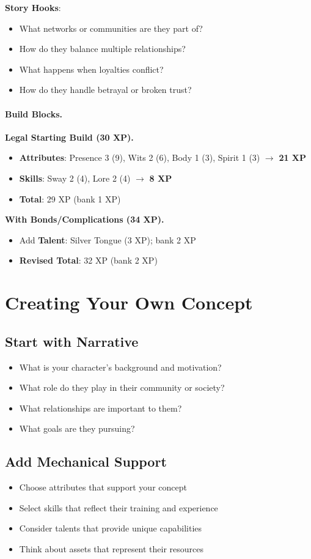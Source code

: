 \begin{multicols}{2}
\textbf{Story Hooks}:
\begin{itemize}
\item What networks or communities are they part of?
\item How do they balance multiple relationships?
\item What happens when loyalties conflict?
\item How do they handle betrayal or broken trust?
\end{itemize}

\paragraph{Build Blocks.}
\textbf{Legal Starting Build (30 XP).}
\begin{itemize}
\item \textbf{Attributes}: Presence 3 (9), Wits 2 (6), Body 1 (3), Spirit 1 (3) $\rightarrow$ \textbf{21 XP}
\item \textbf{Skills}: Sway 2 (4), Lore 2 (4) $\rightarrow$ \textbf{8 XP}
\item \textbf{Total}: 29 XP (bank 1 XP)
\end{itemize}
\textbf{With Bonds/Complications (34 XP).}
\begin{itemize}
\item Add \textbf{Talent}: Silver Tongue (3 XP); bank 2 XP
\item \textbf{Revised Total}: 32 XP (bank 2 XP)
\end{itemize}

\section{Creating Your Own Concept}

\subsection*{Start with Narrative}
\begin{itemize}
\item What is your character's background and motivation?
\item What role do they play in their community or society?
\item What relationships are important to them?
\item What goals are they pursuing?
\end{itemize}

\subsection*{Add Mechanical Support}
\begin{itemize}
\item Choose attributes that support your concept
\item Select skills that reflect their training and experience
\item Consider talents that provide unique capabilities
\item Think about assets that represent their resources
\end{itemize}


\end{multicols}

